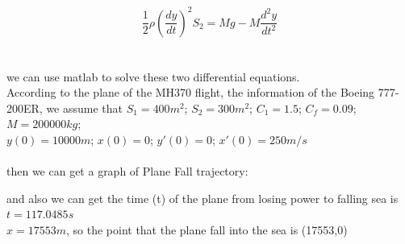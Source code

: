 \documentclass[11pt]{article}
\begin{document}
\[\frac{1}{2}\rho( \frac{dy}{dt})^2 S_2=Mg-M\frac{d^2y}{dt^2}\]
\\\\
we can use matlab to solve these two differential equations.\\
According to the plane of the MH370 flight, the information of the Boeing 777-200ER, we assume that $S_1=400m^2$; $S_2=300m^2$; $C_1=1.5$; $C_f=0.09$; $M=200000kg$;\\
$y(0)=10000m$; $x(0)=0$; $y'(0)=0$; $x'(0)=250m/s$\cite{Jenkinson1999Civil}\\
\\
then we can get a graph of Plane Fall trajectory:\\
\begin{center}
    \end{center}
and also we can get the time (t) of the plane from losing power to falling sea is\ $ t=117.0485s$\\
$x=17553m$, so the point that the plane fall into the sea is (17553,0)\\

\tableofcontents
\end{document}
